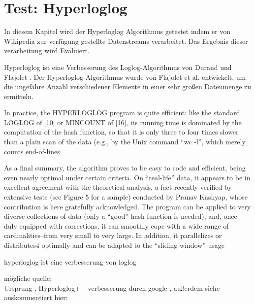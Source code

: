 \section{Test: Hyperloglog}
In diesem Kapitel wird der Hyperloglog Algorithmus getestet indem er von Wikipedia zur verfügung gestellte Datenstreams verarbeitet. Das Ergebnis dieser verarbeitung wird Evaluiert. 

Hyperloglog ist eine Verbesserung des Loglog-Algorithmus von Durand und Flajolet \cite{durand2003}. Der Hyperloglog-Algorithmus wurde von Flajolet et al. \cite{flajolet2007} entwickelt, um die ungefähre Anzahl verschiedener Elemente in einer sehr großen Datenmenge zu ermitteln. 

In practice, the HYPERLOGLOG program is quite efficient: like the standard LOGLOG of [10] or
MINCOUNT of [16], its running time is dominated by the computation of the hash function, so that it is
only three to four times slower than a plain scan of the data (e.g., by the Unix command “wc -l”, which
merely counts end-of-lines \cite{flajolet2007}

As a final summary, the algorithm proves to be easy to code and efficient, being even nearly optimal
under certain criteria. On “real-life” data, it appears to be in excellent agreement with the theoretical analysis,
a fact recently verified by extensive tests (see Figure 5 for a sample) conducted by Pranav Kashyap,
whose contribution is here gratefully acknowledged.
The program can be applied to very diverse collections
of data (only a “good” hash function is needed), and, once duly equipped with corrections, it can
smoothly cope with a wide range of cardinalities–from very small to very large. In addition, it parallelizes
or distributes4 optimally and can be adapted to the “sliding window” usage \cite{flajolet2007}

hyperloglog ist eine verbesserung von loglog \cite{flajolet2007}

mögliche quelle: \\
Ursprung \cite{flajolet2007},
Hyperloglog++ verbesserung durch google \cite{heule2013},
außerdem siehe auskommentiert hier:

